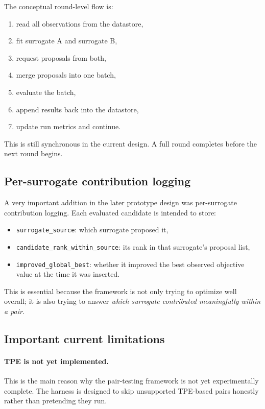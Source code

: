 \documentclass[11pt]{article}
\begin{document}
The conceptual round-level flow is:
\begin{enumerate}[leftmargin=1.5em]
    \item read all observations from the datastore,
    \item fit surrogate A and surrogate B,
    \item request proposals from both,
    \item merge proposals into one batch,
    \item evaluate the batch,
    \item append results back into the datastore,
    \item update run metrics and continue.
\end{enumerate}

This is still synchronous in the current design. A full round completes before the next round begins.

\subsection{Per-surrogate contribution logging}

A very important addition in the later prototype design was per-surrogate contribution logging. Each evaluated candidate is intended to store:
\begin{itemize}[leftmargin=1.5em]
    \item \texttt{surrogate\_source}: which surrogate proposed it,
    \item \texttt{candidate\_rank\_within\_source}: its rank in that surrogate’s proposal list,
    \item \texttt{improved\_global\_best}: whether it improved the best observed objective value at the time it was inserted.
\end{itemize}

This is essential because the framework is not only trying to optimize well overall; it is also trying to answer \emph{which surrogate contributed meaningfully within a pair}.

\subsection{Important current limitations}

\paragraph{TPE is not yet implemented.}
This is the main reason why the pair-testing framework is not yet experimentally complete. The harness is designed to skip unsupported TPE-based pairs honestly rather than pretending they run.
\end{document}
